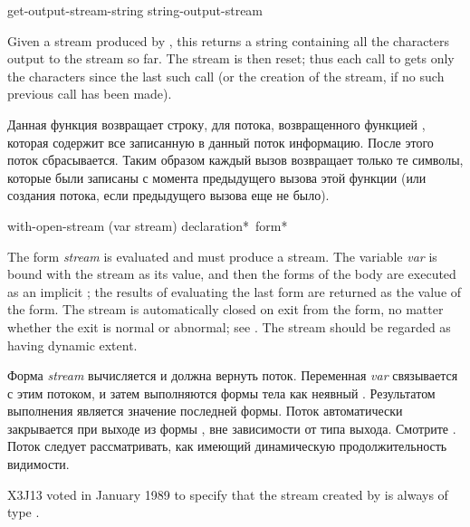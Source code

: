 \begin{defun}[Function]
get-output-stream-string string-output-stream

Given a stream produced by , this
returns a string containing all the characters output to the stream so far.
The stream is then reset; thus each call to 
gets only the characters since the last such call (or the creation
of the stream, if no such previous call has been made).

Данная функция возвращает строку, для потока, возвращенного функцией
, которая содержит все записанную в данный поток
информацию. После этого поток сбрасывается. Таким образом каждый вызов
 возвращает только те символы, которые были
записаны с момента предыдущего вызова этой функции (или создания потока, если
предыдущего вызова еще не было).
\end{defun}

\begin{defmac}
with-open-stream (var stream) {declaration}* {\,form}*

The form \emph{stream} is evaluated and must produce a stream.
The variable \emph{var} is bound with the stream as its value,
and then the forms of the body are executed
as an implicit ; the results of evaluating
the last form are returned as the value of the  form.
The stream
is automatically closed on exit from the  form,
no matter whether the exit is normal or abnormal;
see .
The stream should be regarded as having dynamic extent.

Форма \emph{stream} вычисляется и должна вернуть поток.
Переменная \emph{var} связывается с этим потоком, и затем выполняются формы тела
как неявный . Результатом выполнения  является
значение последней формы.
Поток автоматически закрывается при выходе из формы , вне
зависимости от типа выхода. Смотрите .
Поток следует рассматривать, как имеющий динамическую продолжительность
видимости.
\begin{new}
X3J13 voted in January 1989
to specify that the stream created by
 is always of type .
\end{new}
\end{defmac}

